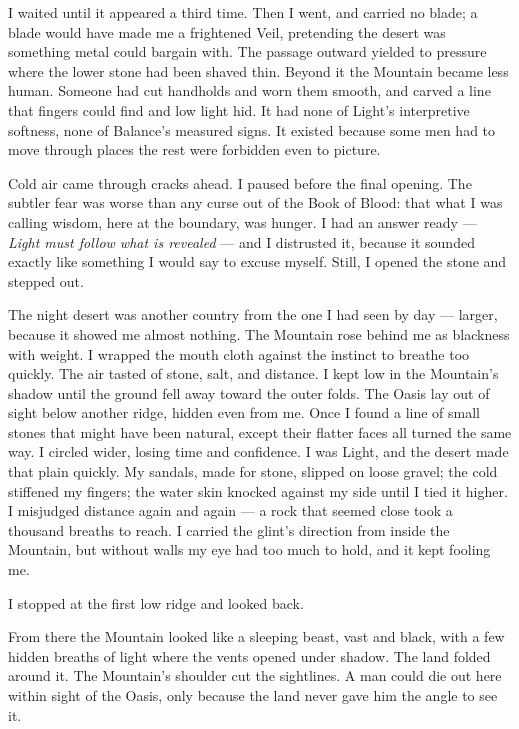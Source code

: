 I waited until it appeared a third time. Then I went, and carried no blade; a blade would have made me a frightened Veil, pretending the desert was something metal could bargain with. The passage outward yielded to pressure where the lower stone had been shaved thin. Beyond it the Mountain became less human. Someone had cut handholds and worn them smooth, and carved a line that fingers could find and low light hid. It had none of Light's interpretive softness, none of Balance's measured signs. It existed because some men had to move through places the rest were forbidden even to picture.\par

Cold air came through cracks ahead. I paused before the final opening. The subtler fear was worse than any curse out of the Book of Blood: that what I was calling wisdom, here at the boundary, was hunger. I had an answer ready --- \textit{Light must follow what is revealed} --- and I distrusted it, because it sounded exactly like something I would say to excuse myself. Still, I opened the stone and stepped out.\par

The night desert was another country from the one I had seen by day --- larger, because it showed me almost nothing. The Mountain rose behind me as blackness with weight. I wrapped the mouth cloth against the instinct to breathe too quickly. The air tasted of stone, salt, and distance. 
I kept low in the Mountain's shadow until the ground fell away toward the outer folds. The Oasis lay out of sight below another ridge, hidden even from me. Once I found a line of small stones that might have been natural, except their flatter faces all turned the same way. I circled wider, losing time and confidence. I was Light, and the desert made that plain quickly. My sandals, made for stone, slipped on loose gravel; the cold stiffened my fingers; the water skin knocked against my side until I tied it higher. I misjudged distance again and again --- a rock that seemed close took a thousand breaths to reach. I carried the glint's direction from inside the Mountain, but without walls my eye had too much to hold, and it kept fooling me.\par

I stopped at the first low ridge and looked back.\par

From there the Mountain looked like a sleeping beast, vast and black, with a few hidden breaths of light where the vents opened under shadow. The land folded around it. The Mountain's shoulder cut the sightlines. A man could die out here within sight of the Oasis, only because the land never gave him the angle to see it.\par


